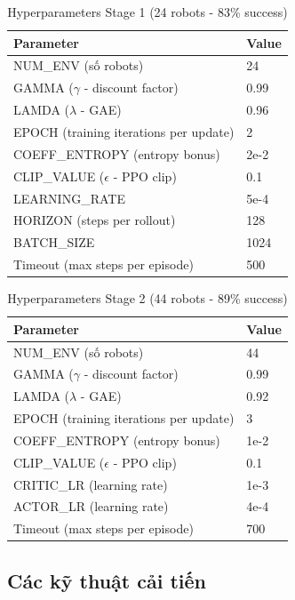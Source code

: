 \begin{table}[H]
\centering
\caption{Hyperparameters Stage 1 (24 robots - 83\% success)}
\label{tab:stage1_hyperparams}
\begin{tabular}{ll}
\hline
\textbf{Parameter} & \textbf{Value} \\
\hline
NUM\_ENV (số robots) & 24 \\
GAMMA ($\gamma$ - discount factor) & 0.99 \\
LAMDA ($\lambda$ - GAE) & 0.96 \\
EPOCH (training iterations per update) & 2 \\
COEFF\_ENTROPY (entropy bonus) & 2e-2 \\
CLIP\_VALUE ($\epsilon$ - PPO clip) & 0.1 \\
LEARNING\_RATE & 5e-4 \\
HORIZON (steps per rollout) & 128 \\
BATCH\_SIZE & 1024 \\
Timeout (max steps per episode) & 500 \\
\hline
\end{tabular}
\end{table}

\begin{table}[H]
\centering
\caption{Hyperparameters Stage 2 (44 robots - 89\% success)}
\label{tab:stage2_hyperparams}
\begin{tabular}{ll}
\hline
\textbf{Parameter} & \textbf{Value} \\
\hline
NUM\_ENV (số robots) & 44 \\
GAMMA ($\gamma$ - discount factor) & 0.99 \\
LAMDA ($\lambda$ - GAE) & 0.92 \\
EPOCH (training iterations per update) & 3 \\
COEFF\_ENTROPY (entropy bonus) & 1e-2 \\
CLIP\_VALUE ($\epsilon$ - PPO clip) & 0.1 \\
CRITIC\_LR (learning rate) & 1e-3 \\
ACTOR\_LR (learning rate) & 4e-4 \\
Timeout (max steps per episode) & 700 \\
\hline
\end{tabular}
\end{table}

\subsection{Các kỹ thuật cải tiến}

